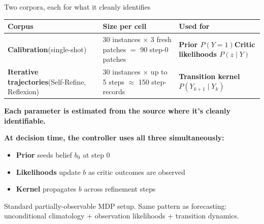 \documentclass[10pt]{beamer}
\newcommand{\good}[1]{\textcolor{accentGreen}{\textbf{#1}}}
\newcommand{\info}[1]{\textcolor{primaryBlue}{\textbf{#1}}}
\begin{document}
\begin{frame}{Two corpora, each for what it cleanly identifies}
\vspace{0.15cm}
\begin{table}
\centering
\small
\begin{tabular}{p{3.4cm}p{3.6cm}p{3.7cm}}
\toprule
\rowcolor{paleBlue}\textbf{Corpus} & \textbf{Size per cell} & \textbf{Used for} \\
\midrule
\rowcolor{paleGreen}
\textcolor{primaryBlue}{\textbf{Calibration}}\newline (single-shot) &
30 instances $\times$ 3 fresh patches $=$ 90 step-0 patches &
\info{Prior $P(Y{=}1)$}\newline\info{Critic likelihoods $P(z\mid Y)$} \\
\rowcolor{paleRed}
\textcolor{accentRed}{\textbf{Iterative trajectories}}\newline (Self-Refine, Reflexion) &
30 instances $\times$ up to 5 steps $\approx$ 150 step-records &
\info{Transition kernel $P(Y_{k+1}\mid Y_k)$} \\
\bottomrule
\end{tabular}
\end{table}

\vspace{0.25cm}
\info{Each parameter is estimated from the source where it's cleanly identifiable.}

\vspace{0.2cm}
\textbf{At decision time, the controller uses all three simultaneously:}
\begin{itemize}
\item \good{Prior} seeds belief $b_0$ at step 0
\item \good{Likelihoods} update $b$ as critic outcomes are observed
\item \good{Kernel} propagates $b$ across refinement steps
\end{itemize}

\textcolor{softGrey}{\scriptsize Standard partially-observable MDP setup. Same
pattern as forecasting: unconditional climatology + observation likelihoods
+ transition dynamics.}
\end{frame}
\end{document}

